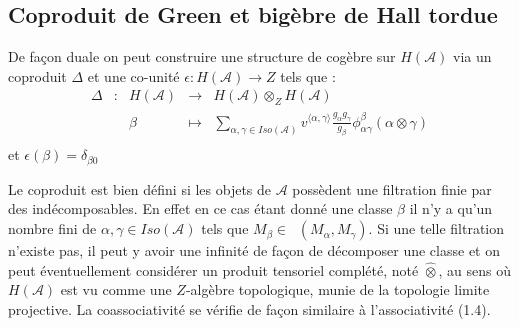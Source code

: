 \documentclass[12pt]{article}
\DeclareMathOperator{\ext}{Ext^{1}}
\theoremstyle{definition}
\begin{document}
\subsection{Coproduit de Green et bigèbre de Hall tordue}
 De façon duale on peut construire une structure de cogèbre sur $H(\mathcal{A})$ via un coproduit $\Delta$ et une co-unité $\epsilon : H(\mathcal{A})\to Z $ tels que :
$$\begin{array}{ccccc}
\Delta & : & H(\mathcal{A}) & \to & H(\mathcal{A})\otimes_Z H(\mathcal{A}) \\
 & & \beta & \mapsto & \underset{\alpha,\gamma\in Iso(\mathcal{A})}{\sum}v^{\langle \alpha,\gamma\rangle}\frac{g_{\alpha}g_{\gamma}}{g_{\beta}}\phi^{\beta}_{\alpha\gamma}(\alpha\otimes\gamma) \\
\end{array}$$ et $\epsilon(\beta)=\delta_{\beta 0}$
\vspace{0.5cm}

Le coproduit est bien défini si les objets de $\mathcal{A}$ possèdent une filtration finie par des indécomposables. En effet en ce cas étant donné une classe $\beta$ il n'y a qu'un nombre fini de $\alpha,\gamma\in Iso(\mathcal{A})$ tels que $M_{\beta}\in\ext(M_\alpha,M_\gamma)$. Si une telle filtration n'existe pas, il peut y avoir une infinité de façon de décomposer une classe et on peut éventuellement considérer un produit tensoriel complété, noté $\widehat{\otimes}$, au sens où $H(\mathcal{A})$ est vu comme une $Z$-algèbre topologique, munie de la topologie limite projective. La coassociativité se vérifie de façon similaire à l'associativité \cite{schif} (1.4). 
\end{document}
